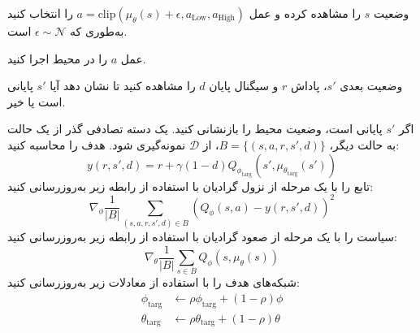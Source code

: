 \begin{algorithm}[H]
\begin{algorithmic}[1]
   \State \parbox[t]{\dimexpr\linewidth-\algorithmicindent}{
 	وضعیت 
 	\(s\)
 	را مشاهده کرده و عمل $a = \text{clip}(\mu_{\theta}(s) + \epsilon, a_{\text{Low}}, a_{\text{High}})$ را انتخاب کنید به‌طوری که $\epsilon \sim \mathcal{N}$ است.
 	\strut}
\State عمل $a$ را در محیط اجرا کنید.
  \State \parbox[t]{\dimexpr\linewidth-\algorithmicindent}{
	 وضعیت بعدی $s'$، پاداش $r$ و سیگنال پایان $d$ را مشاهده کنید تا نشان دهد آیا $s'$ پایانی است یا خیر.
	\strut}
\State اگر $s'$ پایانی است، وضعیت محیط را بازنشانی کنید.
\State یک دسته تصادفی گذر از ‌یک حالت به حالت دیگر، $B = \{ (s,a,r,s',d) \}$، از $\mathcal{D}$ نمونه‌گیری شود.
\State
هدف را محاسبه کنید:
\[ y(r,s',d) = r + \gamma (1-d) Q_{\phi_{\text{targ}}}(s', \mu_{\theta_{\text{targ}}}(s')) \]
\State تابع  را با یک مرحله از نزول گرادیان با استفاده از رابطه زیر به‌روزرسانی کنید:
\[ \nabla_{\phi} \frac{1}{|B|}\sum_{(s,a,r,s',d) \in B} \left( Q_{\phi}(s,a) - y(r,s',d) \right)^2 \]
\State سیاست را با یک مرحله از صعود گرادیان با استفاده از رابطه زیر به‌روزرسانی کنید:
\[ \nabla_{\theta} \frac{1}{|B|}\sum_{s \in B}Q_{\phi}(s, \mu_{\theta}(s)) \]
\State شبکه‌های هدف را با استفاده از معادلات زیر به‌روزرسانی کنید:
\begin{align*}
	\phi_{\text{targ}} &\leftarrow \rho \phi_{\text{targ}} + (1-\rho) \phi \\
	\theta_{\text{targ}} &\leftarrow \rho \theta_{\text{targ}} + (1-\rho) \theta
\end{align*}
\EndFor
\EndIf
\EndWhile
        	\end{algorithmic}
        \end{algorithm}
        
     


